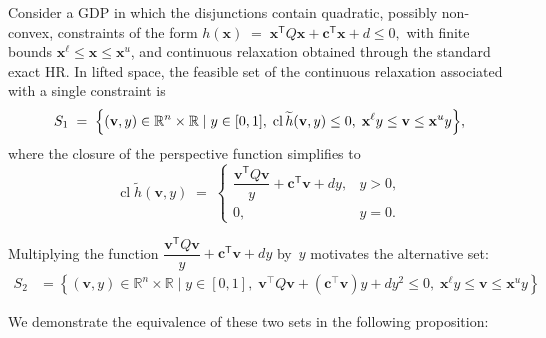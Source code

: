 \documentclass[11pt]{article}
\begin{document}
Consider a GDP in which the disjunctions contain quadratic, possibly non-convex, constraints of the form
\(
    h(\mathbf x)\;=\;\mathbf x^{\mathsf T}Q\mathbf x
                 + \mathbf{c}^{\mathsf T}\mathbf x + d \leq 0,
\)
\noindent with finite bounds \( \mathbf{x}^{\ell} \leq \mathbf{x} \leq \mathbf{x}^{u}\), and continuous relaxation obtained through the standard exact HR.  
In lifted space, the feasible set of the continuous relaxation associated with a single constraint is  
\begin{equation}
    \begin{aligned}
        S_{1}
        \;=\;
        \Bigl\{
            (\mathbf v,y) \in \mathbb{R}^n \times \mathbb{R} \mid y \in [0, 1], \;
            \operatorname{cl}\widetilde h(\mathbf v,y)\le 0,\;
            \mathbf x^{\ell}y\le \mathbf v\le \mathbf x^{u}y
        \Bigr\},
    \end{aligned}
    \label{eq:s1}
\end{equation}
where the closure of the perspective function simplifies to  
\begingroup
\begin{equation}
    \operatorname{cl}\widetilde h(\mathbf v,y)
    \;=\;
    \begin{cases}
        \dfrac{\mathbf v^{\mathsf T}Q\mathbf v}{y}
        + \mathbf{c}^{\mathsf T}\mathbf v
        + dy, & y>0, \\[6pt]
        0, & y=0.
    \end{cases}
    \label{eq:q-closure}
\end{equation}
\endgroup



Multiplying the function \( \dfrac{\mathbf v^{\mathsf T}Q\mathbf v}{y}
        + \mathbf c^{\mathsf T}\mathbf v
        + dy\)  by~\(y\) motivates the alternative
set:
\begin{equation}
\begin{aligned}
S_{2} & =  \left\{ (\mathbf{v}, y) \in \mathbb{R}^n \times \mathbb{R} \mid y \in [0, 1], \; \mathbf{v}^\top Q \mathbf{v} + (\mathbf{c}^\top \mathbf{v}) y + d y^2 \leq 0,  \; \mathbf x^{\ell} y \leq \mathbf{v} \leq \mathbf{x}^u y \right\} &
\end{aligned}
\label{eq:s2}
\end{equation}

We demonstrate the equivalence of these two sets in the following proposition:
\end{document}
